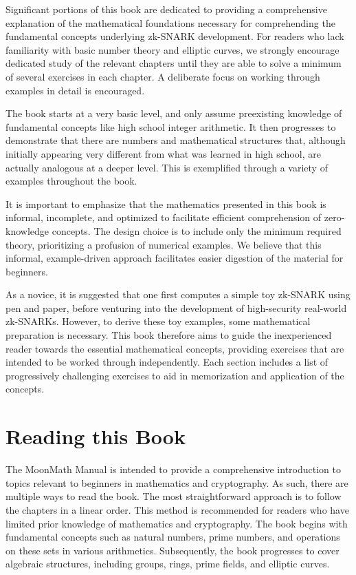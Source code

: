 Significant portions of this book are dedicated to providing a comprehensive explanation of the mathematical foundations necessary for comprehending the fundamental concepts underlying zk-SNARK development. For readers who lack familiarity with basic number theory and elliptic curves, we strongly encourage dedicated study of the relevant chapters until they are able to solve a minimum of several exercises in each chapter. A deliberate focus on working through examples in detail is encouraged.

The book starts at a very basic level, and only assume preexisting knowledge of fundamental concepts like high school integer arithmetic. It then progresses to demonstrate that there are numbers and mathematical structures that, although initially appearing very different from what was learned in high school, are actually analogous at a deeper level. This is exemplified through a variety of examples throughout the book.

It is important to emphasize that the mathematics presented in this book is informal, incomplete, and optimized to facilitate efficient comprehension of zero-knowledge concepts. The design choice is to include only the minimum required theory, prioritizing a profusion of numerical examples. We believe that this informal, example-driven approach facilitates easier digestion of the material for beginners.

As a novice, it is suggested that one first computes a simple toy zk-SNARK using pen and paper, before venturing into the development of high-security real-world zk-SNARKs. However, to derive these toy examples, some mathematical preparation is necessary. This book therefore aims to guide the inexperienced reader towards the essential mathematical concepts, providing exercises that are intended to be worked through independently. Each section includes a list of progressively challenging exercises to aid in memorization and application of the concepts.


\section{Reading this Book}
The MoonMath Manual is intended to provide a comprehensive introduction to topics relevant to beginners in mathematics and cryptography. As such, there are multiple ways to read the book. The most straightforward approach is to follow the chapters in a linear order. This method is recommended for readers who have limited prior knowledge of mathematics and cryptography. The book begins with fundamental concepts such as natural numbers, prime numbers, and operations on these sets in various arithmetics. Subsequently, the book progresses to cover algebraic structures, including groups, rings, prime fields, and elliptic curves.

